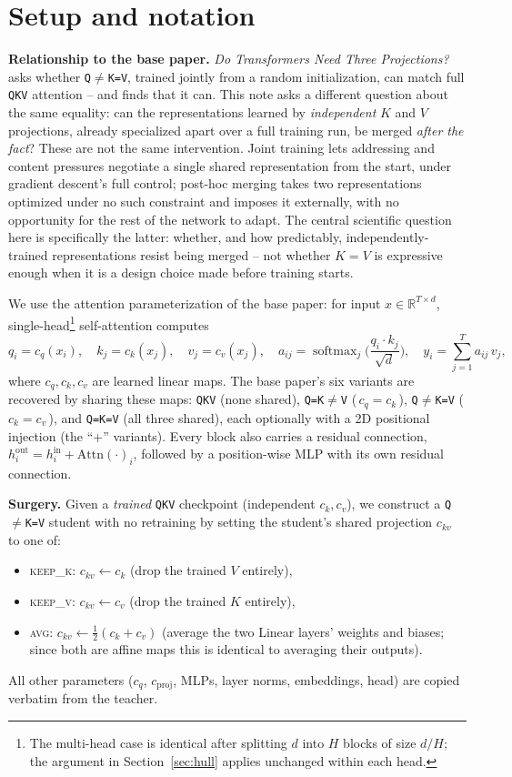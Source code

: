 \documentclass[11pt]{article}
\begin{document}
\section{Setup and notation}
\label{sec:setup}

\textbf{Relationship to the base paper.} \emph{Do Transformers Need Three
Projections?} asks whether \texttt{Q}$\neq$\texttt{K=V}, trained jointly from a
random initialization, can match full \texttt{QKV} attention -- and finds that it
can. This note asks a different question about the same equality: can the
representations learned by \emph{independent} $K$ and $V$ projections, already
specialized apart over a full training run, be merged \emph{after the fact}? These
are not the same intervention. Joint training lets addressing and content pressures
negotiate a single shared representation from the start, under gradient descent's
full control; post-hoc merging takes two representations optimized under no such
constraint and imposes it externally, with no opportunity for the rest of the network
to adapt. The central scientific question here is specifically the latter: whether,
and how predictably, independently-trained representations resist being merged --
not whether $K=V$ is expressive enough when it is a design choice made before
training starts.

We use the attention parameterization of the base paper: for input $x \in
\mathbb{R}^{T\times d}$, single-head\footnote{The multi-head case is identical after
splitting $d$ into $H$ blocks of size $d/H$; the argument in
Section~\ref{sec:hull} applies unchanged within each head.} self-attention computes
\[
q_i = c_q(x_i), \quad k_j = c_k(x_j), \quad v_j = c_v(x_j), \quad
a_{ij} = \operatorname{softmax}_j\!\Big(\frac{q_i \cdot k_j}{\sqrt{d}}\Big), \quad
y_i = \sum_{j=1}^{T} a_{ij}\, v_j,
\]
where $c_q, c_k, c_v$ are learned linear maps. The base paper's six variants are
recovered by sharing these maps: \texttt{QKV} (none shared), \texttt{Q=K}$\neq$\texttt{V}
(\,$c_q = c_k$\,), \texttt{Q}$\neq$\texttt{K=V} (\,$c_k = c_v$\,), and \texttt{Q=K=V}
(all three shared), each optionally with a 2D positional injection (the ``+'' variants).
Every block also carries a residual connection, $h_i^{\text{out}} = h_i^{\text{in}} +
\text{Attn}(\cdot)_i$, followed by a position-wise MLP with its own residual
connection.

\textbf{Surgery.} Given a \emph{trained} \texttt{QKV} checkpoint (independent $c_k,
c_v$), we construct a \texttt{Q}$\neq$\texttt{K=V} student with no retraining by
setting the student's shared projection $c_{kv}$ to one of:
\begin{itemize}
  \item \textsc{keep\_k}: $c_{kv} \leftarrow c_k$ (drop the trained $V$ entirely),
  \item \textsc{keep\_v}: $c_{kv} \leftarrow c_v$ (drop the trained $K$ entirely),
  \item \textsc{avg}: $c_{kv} \leftarrow \tfrac{1}{2}(c_k + c_v)$ (average the two
    Linear layers' weights and biases; since both are affine maps this is identical
    to averaging their outputs).
\end{itemize}
All other parameters ($c_q$, $c_{\text{proj}}$, MLPs, layer norms, embeddings, head)
are copied verbatim from the teacher.
\end{document}
